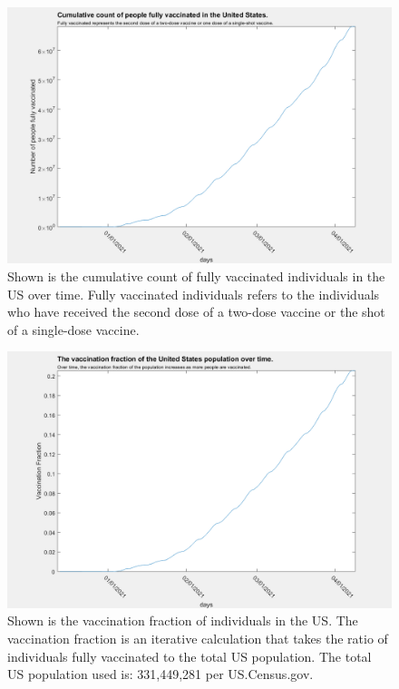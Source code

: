 \documentclass[twoside]{article}
\begin{document}
\begin{multicols}{2}
\begin{figure}[H]
	\includegraphics[width=\linewidth]{images/usa_vac_cumulative.png}
	\caption{Shown is the cumulative count of fully vaccinated individuals in the US over time. Fully vaccinated individuals refers to the individuals who have received the second dose of a two-dose vaccine or the shot of a single-dose vaccine.}
	\label{fig:images/usa_vac_cumulativeLabel}
\end{figure}

\begin{figure}[H]
	\includegraphics[width=\linewidth]{images/vac_fraction_US.png}
	\caption{Shown is the vaccination fraction of individuals in the US. The vaccination fraction is an iterative calculation that takes the ratio of individuals fully vaccinated to the total US population. The total US population used is: 331,449,281 per US.Census.gov.  }
	\label{fig:images/vac_fraction_USLabel}
\end{figure}


\end{multicols}
\end{document}
